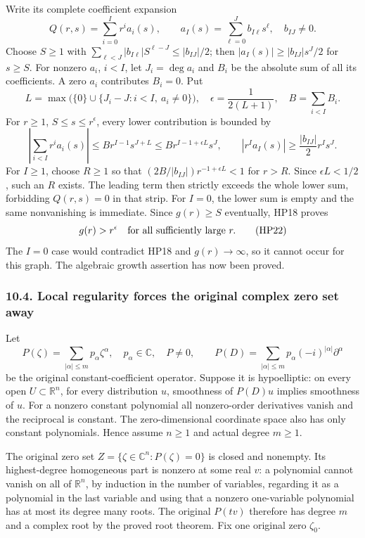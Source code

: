 \documentclass[
  11pt,
]{article}
\begin{document}
Write its complete coefficient expansion \[
Q(r,s)=\sum_{i=0}^{I}r^ia_i(s),\qquad
a_I(s)=\sum_{\ell=0}^{J}b_{I\ell}s^\ell,\quad b_{IJ}\ne0.
\tag{HP19}
\] Choose \(S\geq1\) with
\(\sum_{\ell<J}|b_{I\ell}|S^{\ell-J}\leq |b_{IJ}|/2\); then
\(|a_I(s)|\geq |b_{IJ}|s^J/2\) for \(s\geq S\). For nonzero \(a_i\),
\(i<I\), let \(J_i=\deg a_i\) and \(B_i\) be the absolute sum of all its
coefficients. A zero \(a_i\) contributes \(B_i=0\). Put \[
L=\max\big(\{0\}\cup\{J_i-J:i<I,\ a_i\ne0\}\big),
\quad \epsilon=\frac1{2(L+1)},\quad B=\sum_{i<I}B_i.
\tag{HP20}
\] For \(r\geq1\), \(S\leq s\leq r^\epsilon\), every lower contribution
is bounded by \[
\left|\sum_{i<I}r^ia_i(s)\right|
\leq B r^{I-1}s^{J+L}
\leq B r^{I-1+\epsilon L}s^J,\qquad
|r^Ia_I(s)|\geq \frac{|b_{IJ}|}{2}r^Is^J.
\tag{HP21}
\] For \(I\geq1\), choose \(R\geq1\) so that
\((2B/|b_{IJ}|)r^{-1+\epsilon L}<1\) for \(r>R\). Since
\(\epsilon L<1/2\), such an \(R\) exists. The leading term then strictly
exceeds the whole lower sum, forbidding \(Q(r,s)=0\) in that strip. For
\(I=0\), the lower sum is empty and the same nonvanishing is immediate.
Since \(g(r)\geq S\) eventually, HP18 proves \[
g(r)>r^\epsilon\quad\hbox{for all sufficiently large }r.
\tag{HP22}
\] The \(I=0\) case would contradict HP18 and \(g(r)\to\infty\), so it
cannot occur for this graph. The algebraic growth assertion has now been
proved.

\subsubsection{10.4. Local regularity forces the original complex zero
set
away}\label{local-regularity-forces-the-original-complex-zero-set-away}

Let \[
P(\zeta)=\sum_{|\alpha|\leq m}p_\alpha\zeta^\alpha,\quad
p_\alpha\in\mathbb C,\quad P\ne0,\qquad
P(D)=\sum_{|\alpha|\leq m}p_\alpha(-i)^{|\alpha|}\partial^\alpha
\tag{HP23}
\] be the original constant-coefficient operator. Suppose it is
hypoelliptic: on every open \(U\subset\mathbb R^n\), for every
distribution \(u\), smoothness of \(P(D)u\) implies smoothness of \(u\).
For a nonzero constant polynomial all nonzero-order derivatives vanish
and the reciprocal is constant. The zero-dimensional coordinate space
also has only constant polynomials. Hence assume \(n\geq1\) and actual
degree \(m\geq1\).

The original zero set \(Z=\{\zeta\in\mathbb C^n:P(\zeta)=0\}\) is closed
and nonempty. Its highest-degree homogeneous part is nonzero at some
real \(v\): a polynomial cannot vanish on all of \(\mathbb R^n\), by
induction in the number of variables, regarding it as a polynomial in
the last variable and using that a nonzero one-variable polynomial has
at most its degree many roots. The original \(P(tv)\) therefore has
degree \(m\) and a complex root by the proved root theorem. Fix one
original zero \(\zeta_0\).
\end{document}
